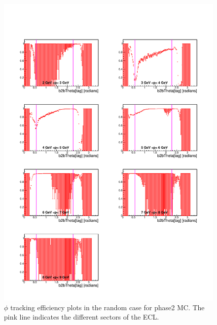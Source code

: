 \documentclass[a4paper,11pt,twosided,final,german,openbib,pdftex,listof=totoc,bibliography=totoc]{scrbook}
\begin{document}
\begin{appendix}
\clearpage
\begin{figure}[!htbp]
	\centering
	\includegraphics[width=\textwidth]{Plots/master/xPMThetaRandom_MC}
	\caption[Momentum $\theta$ Random Efficiency Phase2 MC]{$\phi$ tracking efficiency plots in the random case for phase2 MC. The pink line indicates the different sectors of the ECL.}
	\label{plt:PMThetaRandom_MC}
\end{figure}



\end{appendix}
\end{document}
